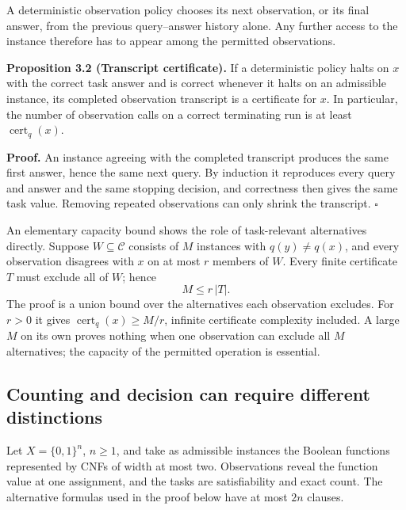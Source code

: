 \documentclass[11pt,letterpaper]{article}
\newenvironment{manualstatement}{%
  \par\addvspace{0.7\baselineskip}\begingroup\itshape\noindent\ignorespaces
}{\par\endgroup\addvspace{0.4\baselineskip}}
\newenvironment{manualproof}{%
  \par\addvspace{0.4\baselineskip}\begingroup\normalfont\noindent\ignorespaces
}{\par\endgroup\addvspace{0.5\baselineskip}}
\begin{document}
A deterministic observation policy chooses its next observation, or its
final answer, from the previous query--answer history alone. Any further
access to the instance therefore has to appear among the permitted
observations.

\begin{manualstatement}

{{\upshape \textbf{Proposition 3.2 (Transcript certificate).}}} If a
deterministic policy halts on \(x\) with the correct task answer and is
correct whenever it halts on an admissible instance, its completed
observation transcript is a certificate for \(x\). In particular, the
number of observation calls on a correct terminating run is at least
\(\operatorname{cert}_q(x)\).

\end{manualstatement}

\begin{manualproof}

\textbf{Proof.} An instance agreeing with the completed transcript
produces the same first answer, hence the same next query. By induction
it reproduces every query and answer and the same stopping decision, and
correctness then gives the same task value. Removing repeated
observations can only shrink the transcript. \(\square\)

\end{manualproof}

An elementary capacity bound shows the role of task-relevant
alternatives directly. Suppose \(W\subseteq\mathcal C\) consists of
\(M\) instances with \(q(y)\ne q(x)\), and every observation disagrees
with \(x\) on at most \(r\) members of \(W\). Every finite certificate
\(T\) must exclude all of \(W\); hence \[M\le r\,|T|.\] The proof is a
union bound over the alternatives each observation excludes. For \(r>0\)
it gives \(\operatorname{cert}_q(x)\ge M/r\), infinite certificate
complexity included. A large \(M\) on its own proves nothing when one
observation can exclude all \(M\) alternatives; the capacity of the
permitted operation is essential.

\subsection{Counting and decision can require different
distinctions}\label{counting-and-decision-can-require-different-distinctions}

Let \(X=\{0,1\}^n\), \(n\ge1\), and take as admissible instances the
Boolean functions represented by CNFs of width at most two. Observations
reveal the function value at one assignment, and the tasks are
satisfiability and exact count. The alternative formulas used in the
proof below have at most \(2n\) clauses.
\end{document}
